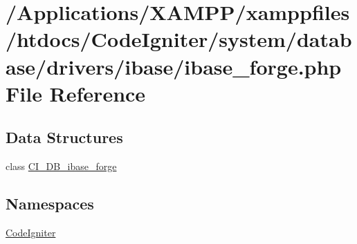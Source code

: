 \hypertarget{ibase__forge_8php}{}\section{/\+Applications/\+X\+A\+M\+P\+P/xamppfiles/htdocs/\+Code\+Igniter/system/database/drivers/ibase/ibase\+\_\+forge.php File Reference}
\label{ibase__forge_8php}
\subsection*{Data Structures}
\begin{DoxyCompactItemize}
\item 
class \mbox{\hyperlink{class_c_i___d_b__ibase__forge}{C\+I\+\_\+\+D\+B\+\_\+ibase\+\_\+forge}}
\end{DoxyCompactItemize}
\subsection*{Namespaces}
\begin{DoxyCompactItemize}
\item 
 \mbox{\hyperlink{namespace_code_igniter}{Code\+Igniter}}
\end{DoxyCompactItemize}
